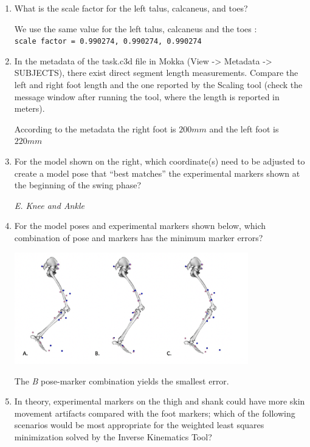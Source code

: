 \documentclass[11pt]{article}
\begin{document}
\begin{enumerate}
    \item What is the scale factor for the left talus, calcaneus, and toes?
    \begin{adjustwidth}{0.5cm}{}
        We use the same value for the left talus, calcaneus and the toes : \\
        \texttt{scale factor =  0.990274, 0.990274, 0.990274}
    \end{adjustwidth}
    \item In the metadata of the task.c3d file in Mokka (View -> Metadata -> SUBJECTS), there exist direct segment length measurements. Compare the left and right foot length and the one reported by the Scaling tool (check the message window after running the tool, where the length is reported in meters).
    \begin{adjustwidth}{0.5cm}{}
        According to the metadata the right foot is $200mm$ and the left foot is $220mm$
    \end{adjustwidth}
    \item For the model shown on the right, which coordinate(s) need to be adjusted to create a model pose that “best matches” the experimental markers shown at the beginning of the swing phase?
    \begin{adjustwidth}{0.5cm}{}
        \textit{E.	Knee and Ankle} 
    \end{adjustwidth} 
    \item For the model poses and experimental markers shown below, which combination of pose and markers has the minimum marker errors?
    \begin{adjustwidth}{0.5cm}{}
        \begin{center}
            \includegraphics[width=0.8\textwidth]{screens/min_pose_error.png}
        \end{center}
        The \textit{B} pose-marker combination yields the smallest error.
    \end{adjustwidth}
    \item In theory, experimental markers on the thigh and shank could have more skin movement artifacts compared with the foot markers; which of the following scenarios would be most appropriate for the weighted least squares minimization solved by the Inverse Kinematics Tool?

\end{enumerate}
\end{document}

